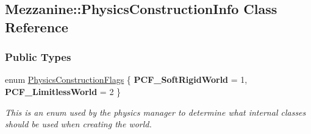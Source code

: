 \hypertarget{classMezzanine_1_1PhysicsConstructionInfo}{
\subsection{Mezzanine::PhysicsConstructionInfo Class Reference}
\label{classMezzanine_1_1PhysicsConstructionInfo}
}
\subsubsection*{Public Types}
\begin{DoxyCompactItemize}
\item 
enum \hyperlink{classMezzanine_1_1PhysicsConstructionInfo_aabf6c8123a05cf8e7b62ce400cd49892}{PhysicsConstructionFlags} \{ {\bfseries PCF\_\-SoftRigidWorld} =  1, 
{\bfseries PCF\_\-LimitlessWorld} =  2
 \}
\begin{DoxyCompactList}\small\item\em This is an enum used by the physics manager to determine what internal classes should be used when creating the world. \item\end{DoxyCompactList}\end{DoxyCompactItemize}
